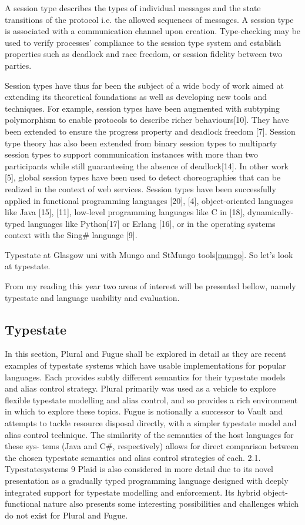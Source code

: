  A session type describes the types of individual messages and the state transitions of the protocol i.e. the allowed sequences of messages. A session type is associated with a communication channel upon creation. Type-checking may be used to verify processes’ compliance to the session type system and establish properties such as deadlock and race freedom, or session fidelity between two parties.


Session types have thus far been the subject of a wide body of work aimed at extending its theoretical foundations as well as developing new tools and techniques. For example, session types have been augmented with subtyping polymorphism to enable protocols to describe richer behaviours[10]. They have been extended to ensure the progress property and deadlock freedom [7]. Session type theory has also been extended from binary session types to multiparty session types to support communication instances with more than two participants while still guaranteeing the absence of deadlock[14]. In other work [5], global session types have been used to detect choreographies that can be realized in the context of web services.
Session types have been successfully applied in functional programming languages [20], [4], object-oriented languages like Java [15], [11], low-level programming languages like C in [18], dynamically-typed languages like Python[17] or Erlang [16], or in the operating systems context with the Sing\# language [9].


Typestate at Glasgow uni with Mungo and StMungo tools\ref{mungo}. So let's look at typestate.

From my reading this year two areas of interest will be presented bellow, namely typestate and language usability and evaluation.

\subsection{Typestate}
In this section, Plural and Fugue shall be explored in detail as they are recent examples of typestate systems which have usable implementations for popular languages. Each provides subtly different semantics for their typestate models and alias control strategy. Plural primarily was used as a vehicle to explore flexible typestate modelling and alias control, and so provides a rich environment in which to explore these topics. Fugue is notionally a successor to Vault and attempts to tackle resource disposal directly, with a simpler typestate model and alias control technique. The similarity of the semantics of the host languages for these sys- tems (Java and C#, respectively) allows for direct comparison between the chosen typestate semantics and alias control strategies of each.
2.1. Typestatesystems 9
 Plaid is also considered in more detail due to its novel presentation as a gradually typed programming language designed with deeply integrated support for typestate modelling and enforcement. Its hybrid object-functional nature also presents some interesting possibilities and challenges which do not exist for Plural and Fugue.


